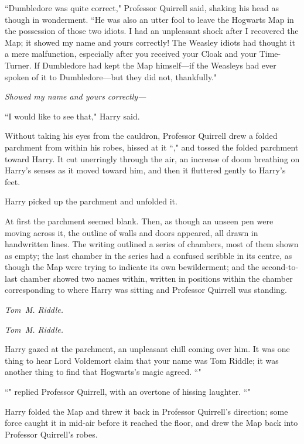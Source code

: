 ``Dumbledore was quite correct," Professor Quirrell said, shaking his head as though in wonderment. ``He was also an utter fool to leave the Hogwarts Map in the possession of those two idiots. I had an unpleasant shock after I recovered the Map; it showed my name and yours correctly! The Weasley idiots had thought it a mere malfunction, especially after you received your Cloak and your Time-Turner. If Dumbledore had kept the Map himself—if the Weasleys had ever spoken of it to Dumbledore—but they did not, thankfully."

\emph{Showed my name and yours correctly—}

``I would like to see that," Harry said.

Without taking his eyes from the cauldron, Professor Quirrell drew a folded parchment from within his robes, hissed at it ``," and tossed the folded parchment toward Harry. It cut unerringly through the air, an increase of doom breathing on Harry's senses as it moved toward him, and then it fluttered gently to Harry's feet.

Harry picked up the parchment and unfolded it.

At first the parchment seemed blank. Then, as though an unseen pen were moving across it, the outline of walls and doors appeared, all drawn in handwritten lines. The writing outlined a series of chambers, most of them shown as empty; the last chamber in the series had a confused scribble in its centre, as though the Map were trying to indicate its own bewilderment; and the second-to-last chamber showed two names within, written in positions within the chamber corresponding to where Harry was sitting and Professor Quirrell was standing.

\emph{Tom~M. Riddle.}

\emph{Tom~M. Riddle.}

Harry gazed at the parchment, an unpleasant chill coming over him. It was one thing to hear Lord Voldemort claim that your name was Tom Riddle; it was another thing to find that Hogwarts's magic agreed. ``"

``" replied Professor Quirrell, with an overtone of hissing laughter. ``"

Harry folded the Map and threw it back in Professor Quirrell's direction; some force caught it in mid-air before it reached the floor, and drew the Map back into Professor Quirrell's robes.

